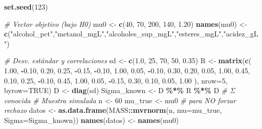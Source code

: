 \documentclass[
]{article}
\newenvironment{Shaded}{\begin{snugshade}}{\end{snugshade}}
\newcommand{\AttributeTok}[1]{\textcolor[rgb]{0.13,0.29,0.53}{#1}}
\newcommand{\CommentTok}[1]{\textcolor[rgb]{0.56,0.35,0.01}{\textit{#1}}}
\newcommand{\ConstantTok}[1]{\textcolor[rgb]{0.56,0.35,0.01}{#1}}
\newcommand{\DecValTok}[1]{\textcolor[rgb]{0.00,0.00,0.81}{#1}}
\newcommand{\FloatTok}[1]{\textcolor[rgb]{0.00,0.00,0.81}{#1}}
\newcommand{\FunctionTok}[1]{\textcolor[rgb]{0.13,0.29,0.53}{\textbf{#1}}}
\newcommand{\NormalTok}[1]{#1}
\newcommand{\OtherTok}[1]{\textcolor[rgb]{0.56,0.35,0.01}{#1}}
\newcommand{\SpecialCharTok}[1]{\textcolor[rgb]{0.81,0.36,0.00}{\textbf{#1}}}
\newcommand{\StringTok}[1]{\textcolor[rgb]{0.31,0.60,0.02}{#1}}
\begin{document}
\begin{Shaded}
\begin{Highlighting}[]
\FunctionTok{set.seed}\NormalTok{(}\DecValTok{123}\NormalTok{)}

\CommentTok{\# Vector objetivo (bajo H0)}
\NormalTok{mu0 }\OtherTok{\textless{}{-}} \FunctionTok{c}\NormalTok{(}\DecValTok{40}\NormalTok{, }\DecValTok{70}\NormalTok{, }\DecValTok{200}\NormalTok{, }\DecValTok{140}\NormalTok{, }\FloatTok{1.20}\NormalTok{)}
\FunctionTok{names}\NormalTok{(mu0) }\OtherTok{\textless{}{-}} \FunctionTok{c}\NormalTok{(}\StringTok{"alcohol\_pct"}\NormalTok{,}\StringTok{"metanol\_mgL"}\NormalTok{,}\StringTok{"alcoholes\_sup\_mgL"}\NormalTok{,}\StringTok{"esteres\_mgL"}\NormalTok{,}\StringTok{"acidez\_gL"}\NormalTok{)}

\CommentTok{\# Desv. estándar y correlaciones}
\NormalTok{sd }\OtherTok{\textless{}{-}} \FunctionTok{c}\NormalTok{(}\FloatTok{1.0}\NormalTok{, }\DecValTok{25}\NormalTok{, }\DecValTok{70}\NormalTok{, }\DecValTok{50}\NormalTok{, }\FloatTok{0.35}\NormalTok{)}
\NormalTok{R  }\OtherTok{\textless{}{-}} \FunctionTok{matrix}\NormalTok{(}\FunctionTok{c}\NormalTok{(}
  \FloatTok{1.00}\NormalTok{, }\SpecialCharTok{{-}}\FloatTok{0.10}\NormalTok{,  }\FloatTok{0.20}\NormalTok{,  }\FloatTok{0.25}\NormalTok{, }\SpecialCharTok{{-}}\FloatTok{0.15}\NormalTok{,}
 \SpecialCharTok{{-}}\FloatTok{0.10}\NormalTok{,  }\FloatTok{1.00}\NormalTok{,  }\FloatTok{0.05}\NormalTok{, }\SpecialCharTok{{-}}\FloatTok{0.10}\NormalTok{,  }\FloatTok{0.30}\NormalTok{,}
  \FloatTok{0.20}\NormalTok{,  }\FloatTok{0.05}\NormalTok{,  }\FloatTok{1.00}\NormalTok{,  }\FloatTok{0.45}\NormalTok{,  }\FloatTok{0.10}\NormalTok{,}
  \FloatTok{0.25}\NormalTok{, }\SpecialCharTok{{-}}\FloatTok{0.10}\NormalTok{,  }\FloatTok{0.45}\NormalTok{,  }\FloatTok{1.00}\NormalTok{,  }\FloatTok{0.05}\NormalTok{,}
 \SpecialCharTok{{-}}\FloatTok{0.15}\NormalTok{,  }\FloatTok{0.30}\NormalTok{,  }\FloatTok{0.10}\NormalTok{,  }\FloatTok{0.05}\NormalTok{,  }\FloatTok{1.00}
\NormalTok{), }\AttributeTok{nrow=}\DecValTok{5}\NormalTok{, }\AttributeTok{byrow=}\ConstantTok{TRUE}\NormalTok{)}
\NormalTok{D }\OtherTok{\textless{}{-}} \FunctionTok{diag}\NormalTok{(sd)}
\NormalTok{Sigma\_known }\OtherTok{\textless{}{-}}\NormalTok{ D }\SpecialCharTok{\%*\%}\NormalTok{ R }\SpecialCharTok{\%*\%}\NormalTok{ D   }\CommentTok{\# Σ conocida }
\CommentTok{\# Muestra simulada}
\NormalTok{n }\OtherTok{\textless{}{-}} \DecValTok{60}
\NormalTok{mu\_true }\OtherTok{\textless{}{-}}\NormalTok{ mu0         }\CommentTok{\# para NO forzar rechazo}
\NormalTok{datos }\OtherTok{\textless{}{-}} \FunctionTok{as.data.frame}\NormalTok{(MASS}\SpecialCharTok{::}\FunctionTok{mvrnorm}\NormalTok{(n, }\AttributeTok{mu=}\NormalTok{mu\_true, }\AttributeTok{Sigma=}\NormalTok{Sigma\_known))}
\FunctionTok{names}\NormalTok{(datos) }\OtherTok{\textless{}{-}} \FunctionTok{names}\NormalTok{(mu0)}
\end{Highlighting}
\end{Shaded}
\end{document}
